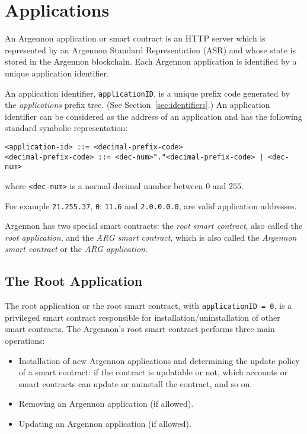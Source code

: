 

\section{Applications}\label{sec:applications}

An Argennon application or smart contract is an HTTP server which is represented by an Argennon Standard
Representation (ASR) and whose state is stored in the Argennon blockchain. Each Argennon application is identified by
a unique application identifier.

An application identifier, \texttt{applicationID}, is
a unique prefix code generated by the \emph{applications} prefix tree. (See Section~\ref{sec:identifiers}.)
An application identifier can be considered as the address of an application and has the following standard symbolic
representation:
\begin{verbatim}
<application-id> ::= <decimal-prefix-code>
<decimal-prefix-code> ::= <dec-num>"."<decimal-prefix-code> | <dec-num>
\end{verbatim}
where \texttt{<dec-num>} is a normal decimal number between $0$ and $255$.

For example \texttt{21.255.37}, \texttt{0}, \texttt{11.6} and \texttt{2.0.0.0.0}, are valid application addresses.

Argennon has two special smart contracts: the \emph{root smart contract}, also called the \emph{root application}, and
the \emph{ARG smart contract}, which is also called the \emph{Argennon smart contract} or the \emph{ARG application}.

\subsection{The Root Application}\label{subsec:the-root-app}

The root application or the root smart contract, with \texttt{applicationID = 0}, is a privileged smart contract
responsible for installation/uninstallation of other smart contracts. The Argennon's root smart contract
performs three main operations:

\begin{itemize}
    \item Installation of new Argennon applications and determining the update policy of a smart
    contract: if the contract is updatable or not, which accounts or smart contracts can update or uninstall
    the contract, and so on.
    \item Removing an Argennon application (if allowed).
    \item Updating an Argennon application (if allowed).
\end{itemize}

